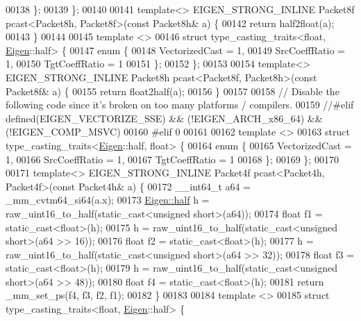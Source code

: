 \begin{DoxyCode}
00138   \};
00139 \};
00140 
00141 \textcolor{keyword}{template}<> EIGEN\_STRONG\_INLINE Packet8f pcast<Packet8h, Packet8f>(\textcolor{keyword}{const} Packet8h& a) \{
00142   \textcolor{keywordflow}{return} half2float(a);
00143 \}
00144 
00145 \textcolor{keyword}{template} <>
00146 \textcolor{keyword}{struct }type\_casting\_traits<float, \hyperlink{namespace_eigen}{Eigen}::half> \{
00147   \textcolor{keyword}{enum} \{
00148     VectorizedCast = 1,
00149     SrcCoeffRatio = 1,
00150     TgtCoeffRatio = 1
00151   \};
00152 \};
00153 
00154 \textcolor{keyword}{template}<> EIGEN\_STRONG\_INLINE Packet8h pcast<Packet8f, Packet8h>(\textcolor{keyword}{const} Packet8f& a) \{
00155   \textcolor{keywordflow}{return} float2half(a);
00156 \}
00157 
00158 \textcolor{comment}{// Disable the following code since it's broken on too many platforms / compilers.}
00159 \textcolor{comment}{//#elif defined(EIGEN\_VECTORIZE\_SSE) && (!EIGEN\_ARCH\_x86\_64) && (!EIGEN\_COMP\_MSVC)}
00160 \textcolor{preprocessor}{#elif 0}
00161 
00162 \textcolor{keyword}{template} <>
00163 \textcolor{keyword}{struct }type\_casting\_traits<\hyperlink{namespace_eigen}{Eigen}::half, float> \{
00164   \textcolor{keyword}{enum} \{
00165     VectorizedCast = 1,
00166     SrcCoeffRatio = 1,
00167     TgtCoeffRatio = 1
00168   \};
00169 \};
00170 
00171 \textcolor{keyword}{template}<> EIGEN\_STRONG\_INLINE Packet4f pcast<Packet4h, Packet4f>(\textcolor{keyword}{const} Packet4h& a) \{
00172   \_\_int64\_t a64 = \_mm\_cvtm64\_si64(a.x);
00173   \hyperlink{struct_eigen_1_1half}{Eigen::half} h = raw\_uint16\_to\_half(static\_cast<unsigned short>(a64));
00174   \textcolor{keywordtype}{float} f1 = \textcolor{keyword}{static\_cast<}\textcolor{keywordtype}{float}\textcolor{keyword}{>}(h);
00175   h = raw\_uint16\_to\_half(static\_cast<unsigned short>(a64 >> 16));
00176   \textcolor{keywordtype}{float} f2 = \textcolor{keyword}{static\_cast<}\textcolor{keywordtype}{float}\textcolor{keyword}{>}(h);
00177   h = raw\_uint16\_to\_half(static\_cast<unsigned short>(a64 >> 32));
00178   \textcolor{keywordtype}{float} f3 = \textcolor{keyword}{static\_cast<}\textcolor{keywordtype}{float}\textcolor{keyword}{>}(h);
00179   h = raw\_uint16\_to\_half(static\_cast<unsigned short>(a64 >> 48));
00180   \textcolor{keywordtype}{float} f4 = \textcolor{keyword}{static\_cast<}\textcolor{keywordtype}{float}\textcolor{keyword}{>}(h);
00181   \textcolor{keywordflow}{return} \_mm\_set\_ps(f4, f3, f2, f1);
00182 \}
00183 
00184 \textcolor{keyword}{template} <>
00185 \textcolor{keyword}{struct }type\_casting\_traits<float, \hyperlink{namespace_eigen}{Eigen}::half> \{

\end{DoxyCode}
